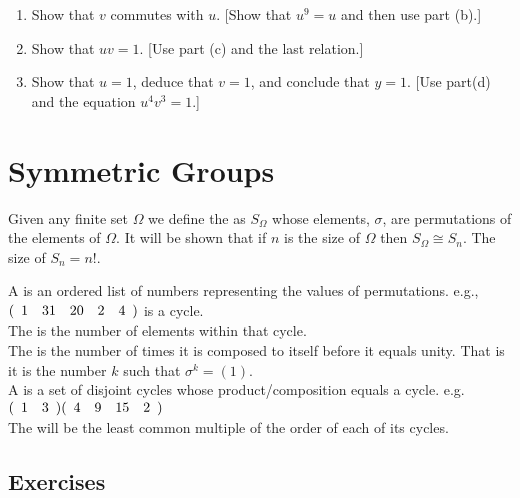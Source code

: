 \documentclass[10pt,a4paper]{report}
\begin{document}
\begin{enumerate}
\begin{enumerate}
	\item Show that $v$ commutes with $u$.  [Show that $u^9=u$ and then use part (b).]
	
	\item Show that $uv=1$.  [Use part (c) and the last relation.]
	
	\item Show that $u=1$, deduce that $v=1$, and conclude that $y=1$.  [Use part(d) and the equation $u^4v^3=1$.]
\end{enumerate}

\end{enumerate}

\section{Symmetric Groups}

\begin{definition}Given any finite set $\Omega$ we define the  as $S_\Omega$ whose elements, $\sigma$, are permutations of the elements of $\Omega$.  It will be shown that if $n$ is the size of $\Omega$ then $S_\Omega \cong S_n$.  The size of $S_n = n!$.

\end{definition}

\begin{definition}A  is an ordered list of numbers representing the values of permutations.  e.g., $(\begin{array}{cccccccccc} 1&31&20&2&4 \end{array})$ is a cycle.\\
The  is the number of elements within that cycle.\\
The  is the number of times it is composed to itself before it equals unity.  That is it is the number $k$ such that $\sigma^k = (1)$.\\
A  is a set of disjoint cycles whose product/composition equals a cycle.  e.g. $(\begin{array}{cccccccccc} 1&3 \end{array})(\begin{array}{cccccccccc} 4&9&15&2 \end{array})$\\
The  will be the least common multiple of the order of each of its cycles.
\end{definition}

\subsection{Exercises}
\end{document}

